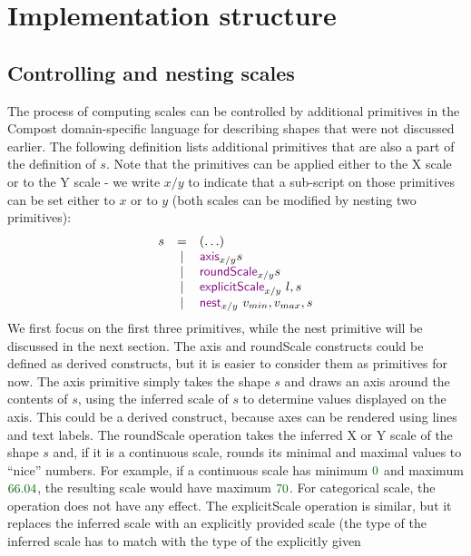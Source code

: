 \documentclass{jfp}
\newcommand{\num}[1]{\textcolor{numclr}{#1}}
\newcommand{\kvd}[1]{\textnormal{\textcolor{kvdclr}{\sffamily #1}}}
\begin{document}
\section{Implementation structure}
\label{sec:impl}

\newpage


\subsection*{Controlling and nesting scales}
The process of computing scales can be controlled by additional primitives in the Compost
domain-specific language for describing shapes that were not discussed earlier. The following
definition lists additional primitives that are also a part of the definition of $s$. Note that
the primitives can be applied either to the X scale or to the Y scale - we write $x/y$ to indicate
that a sub-script on those primitives can be set either to $x$ or to $y$ (both scales can be
modified by nesting two primitives):
%
\begin{equation*}
\begin{array}{rcl}
s & = & (\ldots)\\
 & | & \kvd{axis}_{x/y} s\\
 & | & \kvd{roundScale}_{x/y} s\\
 & | & \kvd{explicitScale}_{x/y}~l, s\\
 & | & \kvd{nest}_{x/y}~v_{min}, v_{max}, s
\end{array}
\end{equation*}
%
We first focus on the first three primitives, while the \kvd{nest} primitive will be discussed in
the next section. The \kvd{axis} and \kvd{roundScale} constructs could be defined as derived constructs,
but it is easier to consider them as primitives for now. The \kvd{axis} primitive simply takes the shape
$s$ and draws an axis around the contents of $s$, using the inferred scale of $s$ to determine values
displayed on the axis. This could be a derived construct, because axes can be rendered using lines
and text labels.
The \kvd{roundScale} operation takes the inferred X or Y scale of the shape $s$ and, if it is a
continuous scale, rounds its minimal and maximal values to ``nice'' numbers. For example, if a
continuous scale has minimum $\num{0}$ and maximum $\num{66.04}$, the resulting scale would have
maximum $\num{70}$. For categorical scale, the operation does not have any effect.
The \kvd{explicitScale} operation is similar, but it replaces the inferred scale with an explicitly
provided scale (the type of the inferred scale has to match with the type of the explicitly given
\end{document}
